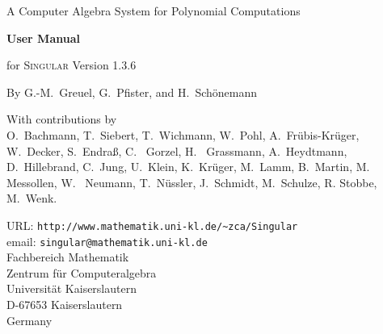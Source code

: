 \documentclass[a4paper,german]{article}
\begin{document}

\begin{center}
\begin{figure}[h]
\noindent
\centering{}
\end{figure}

    {\Large A Computer Algebra System for Polynomial Computations}

\vspace{15ex}

\Huge{\textbf{User Manual}}

\huge{for \textsc{Singular} Version 1.3.6}

\vspace{5ex}

\Large{By G.-M.~Greuel, G.~Pfister, and H.~Schönemann}
\end{center}

\begin{center}
  \large{With contributions by} \\
\large{O.~Bachmann, T.~Siebert, T.~Wichmann, W.~Pohl,
A.~Frübis-Krüger, W.~Decker, S.~Endra\ss, C.~ Gorzel, H.~ Grassmann,
A.~Heydtmann, D.~Hillebrand, C.~Jung, U.~Klein, K.~Krüger, M.~Lamm,
B.~Martin, M.~ Messollen, W.~ Neumann, T.~Nüssler, J.~Schmidt, M.~Schulze, R.
Stobbe, M.~Wenk.}
\end{center}

\vspace{20ex}

\begin{center}
  \large{
    URL: \verb?http://www.mathematik.uni-kl.de/~zca/Singular? \\
    email: \verb?singular@mathematik.uni-kl.de?\\
    Fachbereich Mathematik \\
    Zentrum für Computeralgebra \\
    Universität Kaiserslautern \\
    D-67653 Kaiserslautern \\
    Germany}
\end{center}
\end{document}
